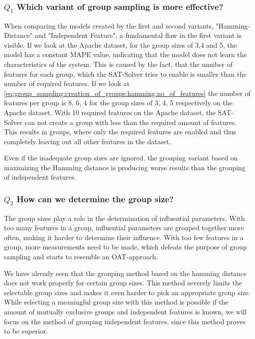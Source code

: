 \documentclass[../../thesis.tex]{subfiles}
\begin{document}
\subsubsection{$Q_1$ Which variant of group sampling is more effective?}
When comparing the models created by the first and second variants, "Hamming-Distance" and "Independent Feature",
a fundamental flaw in the first variant is visible. If we look at the Apache dataset, for the group sizes of
3,4 and 5, the model has a constant MAPE value, indicating that the model does not learn the characteristics of the system.
This is caused by the fact, that the number of features for each group, which the SAT-Solver tries to enable is smaller
than the number of required features. If we look at \autoref{eq:group_sampling:creation_of_groups:hamming:no_of_features}
the number of features per group is 8, 6, 4 for the group sizes of 3, 4, 5 respectively on the Apache dataset.
With 10 required features on the Apache dataset, the SAT-Solver can not create a group with less than the required
amount of features. This results in groups, where only the required features are enabled and thus completely
leaving out all other features in the dataset.

Even if the inadequate group sizes are ignored, the grouping variant based on maximizing the Hamming distance
is producing worse results than the grouping of independent features.


\subsubsection{$Q_2$ How can we determine the group size?}

The group sizes play a role in the determination of influential parameters.
With too many features in a group, influential parameters are grouped together more often,
making it harder to determine their influence. With too few features in a group, more
measurements need to be made, which defeats the purpose of group sampling and starts to resemble an OAT-approach.

We have already seen that the grouping method based on the hamming distance does not work properly for
certain group sizes. This method severely limits the selectable group sizes and makes it even harder
to pick an appropriate group size. While selecting a meaningful group size with this method is possible if
the amount of mutually exclusive groups and independent features is known, we will focus on the method
of grouping independent features, since this method proves to be superior.
\end{document}
